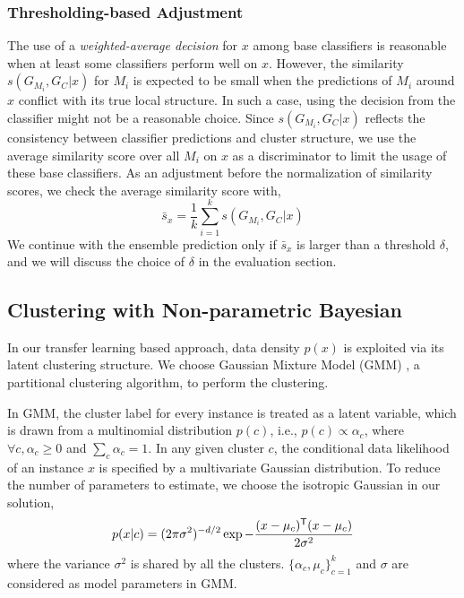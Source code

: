 \subsubsection{Thresholding-based Adjustment}
The use of a \emph{weighted-average decision} for $x$ among base classifiers is reasonable when at least some classifiers perform well on $x$. 
However, the similarity $s(G_{M_i}, G_C|x)$ for $M_i$ is expected to be small when the predictions of $M_i$ around $x$ conflict with its true local structure. 
In such a case, using the decision from the classifier might not be a reasonable choice. 
Since $s(G_{M_i}, G_C|x)$ reflects the consistency between classifier predictions and cluster structure, we use the average similarity score over all $M_i$ on $x$ as a discriminator to limit the usage of these base classifiers.
As an adjustment before the normalization of similarity scores, we check the average similarity score with,
\begin{equation}\label{ave_sim}
 \bar s_x = \frac {1}{k}\sum_{i=1}^k s(G_{M_i}, G_C|x)
\end{equation}
We continue with the ensemble prediction only if $\bar s_x$ is larger than a threshold $\delta$, and we will discuss the choice of $\delta$ in the evaluation section.


\subsection{Clustering with Non-parametric Bayesian}
\label{sec_clustering}
In our transfer learning based approach, data density $p(x)$ is exploited via its latent clustering structure. We choose Gaussian Mixture Model (GMM) \cite{zivkovic2004improved}, a partitional clustering algorithm, to perform the clustering.

In GMM, the cluster label for every instance is treated as a latent variable, which is drawn from a multinomial distribution $p(c)$, i.e., $p(c)\propto\alpha_c$, where $\forall c, \alpha_c\ge0$ and $\sum_c\alpha_c=1$. In any given cluster $c$, the conditional data likelihood of an instance $x$ is specified by a multivariate Gaussian distribution. To reduce the number of parameters to estimate, we choose the isotropic Gaussian in our solution,
\begin{equation}
p(x|c)=(2\pi\sigma^2)^{-d/2}\exp{-\frac{(x-\mu_c)^{\mathsf{T}}(x-\mu_c)}{2\sigma^2}}
\end{equation}
where the variance $\sigma^2$ is shared by all the clusters. $\{\alpha_c, \mu_c\}^k_{c=1}$ and $\sigma$ are considered as model parameters in GMM.

